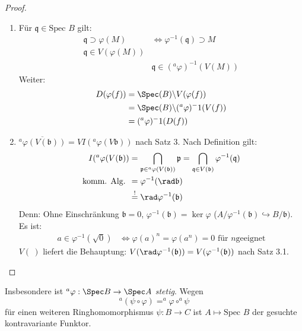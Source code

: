 \begin{proof} \mbox{}
  \begin{enumerate}
  \item Für $\mathfrak{q}\in\text{Spec }B$ gilt:
    \begin{align}
      \mathfrak{q}\supset\varphi(M)
      & \Leftrightarrow\varphi^{-1}(\mathfrak{q})\supset M\\
      \mathfrak{q}\in V(\varphi(M)) & \\
      & \mathfrak{q}\in(^a\varphi)^{-1}(V(M))
    \end{align}
    Weiter:
    \begin{align}
      D(\varphi(f)) & =\Spec(B)\backslash V(\varphi(f)) \\
                    & =\Spec(B)\backslash (^a\varphi)^-1 (V(f)) \\
                    & = (^a\varphi)^-1 (D(f))
    \end{align}
     
  \item
    $\overline{^{a}\varphi(V(\mathfrak{b}))}=VI(^{a}\varphi(V\mathfrak{b}))$
    nach Satz 3. Nach Definition gilt:
    \begin{align*} I(^{a}\varphi(V(\mathfrak{b}))
      & =\bigcap_{\mathfrak{p}\in^{a}\varphi(V(\mathfrak{b}))}
        \mathfrak{p}=\bigcap_{\mathfrak{q}\in V(\mathfrak{b})}
        \varphi^{-1}(\mathfrak{q})\\ \text{komm. Alg. }
      & =\varphi^{-1}(\rad\mathfrak{b})\\
      & \overset{!}{=}\rad\varphi^{-1}(\mathfrak{b})
    \end{align*}
    Denn: Ohne Einschränkung $\mathfrak{b}=0$,
    $\varphi^{-1}(\mathfrak{b})=\ker\varphi$
    ($A/\varphi^{-1}(\mathfrak{b})\hookrightarrow B/\mathfrak{b})$. Es
    ist:
    \begin{align*}
      a\in\varphi^{-1}(\sqrt{0})
      & \Leftrightarrow\varphi(a)^{n}=\varphi(a^{n})=0
        \text{ für }n\text{geeignet}
    \end{align*} $V(\ )$
    liefert die Behauptung: $V(\rad\varphi^{-1}
    (\mathfrak{b}))=V(\varphi^{-1}(\mathfrak{b}))$ nach Satz 3.1.
  \end{enumerate}
\end{proof}
Insbesondere ist $^{a}\varphi:\Spec B\rightarrow\Spec A$
\emph{stetig}.  Wegen
\[
  ^{a}(\psi\circ\varphi)=^{a}\varphi\circ^{a}\psi
\]
für einen weiteren Ringhomomorphismus $\psi:B\rightarrow C$ ist
$A\mapsto\text{Spec }B$ der gesuchte kontravariante Funktor.

